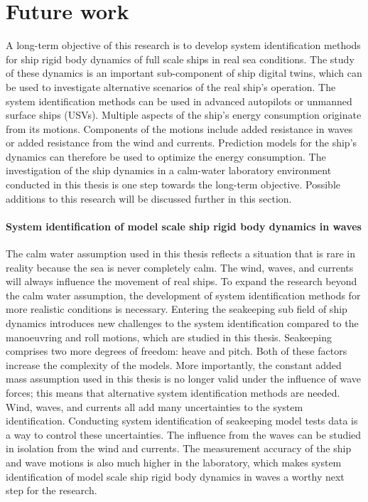 \chapter{Future work\label{ch:future_work}}
A long-term objective of this research is to develop system identification methods for ship rigid body dynamics of full scale ships in real sea conditions. The study of these dynamics is an important sub-component of ship digital twins, which can be used to investigate alternative scenarios of the real ship's operation. The system identification methods can be used in advanced autopilots or unmanned surface ships (USVs). Multiple aspects of the ship's energy consumption originate from its motions. Components of the motions include added resistance in waves or added resistance from the wind and currents. Prediction models for the ship's dynamics can therefore be used to optimize the energy consumption. The investigation of the ship dynamics in a calm-water laboratory environment conducted in this thesis is one step towards the long-term objective. Possible additions to this research will be discussed further in this section.  

\subsubsection*{\normalfont \color{black} \textbf{System identification of model scale ship rigid body dynamics in waves}}
The calm water assumption used in this thesis reflects a situation that is rare in reality because the sea is never completely calm. The wind, waves, and currents will always influence the movement of real ships. To expand the research beyond the calm water assumption, the development of system identification methods for more realistic conditions is necessary. Entering the seakeeping sub field of ship dynamics introduces new challenges to the system identification compared to the manoeuvring and roll motions, which are studied in this thesis. Seakeeping comprises two more degrees of freedom: heave and pitch. Both of these factors increase the complexity of the models. More importantly, the constant added mass assumption used in this thesis is no longer valid under the influence of wave forces; this means that alternative system identification methods are needed. Wind, waves, and currents all add many uncertainties to the system identification. Conducting system identification of seakeeping model tests data is a way to control these uncertainties. The influence from the waves can be studied in isolation from the wind and currents. The measurement accuracy of the ship and wave motions is also much higher in the laboratory, which makes system identification of model scale ship rigid body dynamics in waves a worthy next step for the research.  


